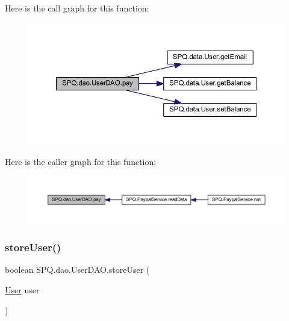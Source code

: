 Here is the call graph for this function\+:\nopagebreak
\begin{figure}[H]
\begin{center}
\leavevmode
\includegraphics[width=350pt]{class_s_p_q_1_1dao_1_1_user_d_a_o_a8223c677b1ae55147860ea533be434a7_cgraph}
\end{center}
\end{figure}
Here is the caller graph for this function\+:\nopagebreak
\begin{figure}[H]
\begin{center}
\leavevmode
\includegraphics[width=350pt]{class_s_p_q_1_1dao_1_1_user_d_a_o_a8223c677b1ae55147860ea533be434a7_icgraph}
\end{center}
\end{figure}
\mbox{\label{class_s_p_q_1_1dao_1_1_user_d_a_o_ad86d4148c7f3fd960fb32de7c68f3f6a}} 
\subsubsection{\texorpdfstring{store\+User()}{storeUser()}\hspace{0.1cm}{\footnotesize\ttfamily [1/2]}}
{\footnotesize\ttfamily boolean S\+P\+Q.\+dao.\+User\+D\+A\+O.\+store\+User (\begin{DoxyParamCaption}\item[{\mbox{\hyperlink{class_s_p_q_1_1data_1_1_user}{User}}}]{user }\end{DoxyParamCaption})}



